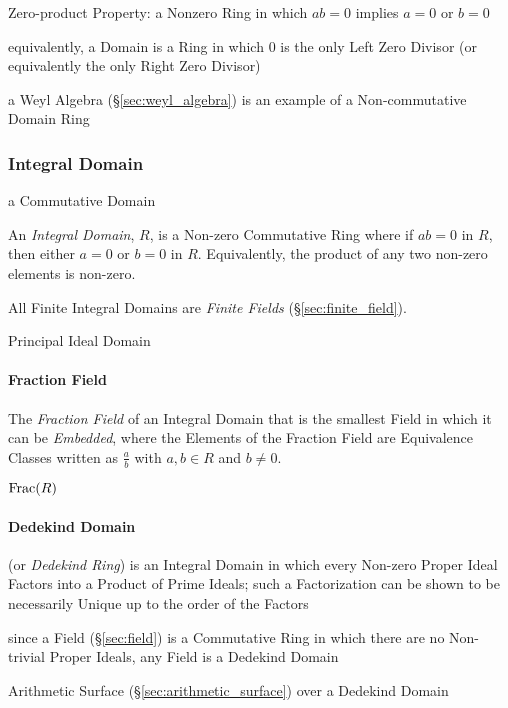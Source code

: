 Zero-product Property: a Nonzero Ring in which $ab = 0$ implies $a = 0$ or
$b = 0$

equivalently, a Domain is a Ring in which $0$ is the only Left Zero Divisor (or
equivalently the only Right Zero Divisor)

a Weyl Algebra (\S\ref{sec:weyl_algebra}) is an example of a Non-commutative
Domain Ring



\subsubsection{Integral Domain}\label{sec:integral_domain}

a Commutative Domain

An \emph{Integral Domain}, $R$, is a Non-zero Commutative Ring where
if $ab = 0$ in $R$, then either $a = 0$ or $b = 0$ in $R$.
Equivalently, the product of any two non-zero elements is non-zero.

All Finite Integral Domains are \emph{Finite Fields}
(\S\ref{sec:finite_field}).

Principal Ideal Domain



\paragraph{Fraction Field}\label{sec:fraction_field}\hfill

The \emph{Fraction Field} of an Integral Domain that is the smallest Field in
which it can be \emph{Embedded}, where the Elements of the Fraction Field are
Equivalence Classes written as $\frac{a}{b}$ with $a, b \in R$ and $b \neq 0$.

$\mathrm{Frac}(R)$



\paragraph{Dedekind Domain}\label{sec:dedekind_domain}\hfill

(or \emph{Dedekind Ring}) is an Integral Domain in which every Non-zero Proper
Ideal Factors into a Product of Prime Ideals; such a Factorization can be shown
to be necessarily Unique up to the order of the Factors

since a Field (\S\ref{sec:field}) is a Commutative Ring in which there are no
Non-trivial Proper Ideals, any Field is a Dedekind Domain

\fist Arithmetic Surface (\S\ref{sec:arithmetic_surface}) over a Dedekind Domain




